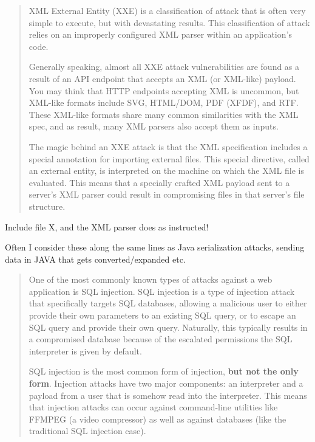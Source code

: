 \documentclass[Screen16to9,17pt]{foils}
\begin{document}
\begin{quote}
XML External Entity (XXE) is a classification of attack that is often very simple to execute, but with devastating results. This classification of attack relies on an improperly configured XML parser within an application’s code.

Generally speaking, almost all XXE attack vulnerabilities are found as a result of an API endpoint that accepts an XML (or XML-like) payload. You may think that HTTP endpoints accepting XML is uncommon, but XML-like formats include SVG, HTML/DOM, PDF (XFDF), and RTF. These XML-like formats share many common similarities with the XML spec, and as result, many XML parsers also accept them as inputs.

The magic behind an XXE attack is that the XML specification includes a special annotation for importing external files. This special directive, called an external entity, is interpreted on the machine on which the XML file is evaluated. This means that a specially crafted XML payload sent to a server’s XML parser could result in compromising files in that server’s file structure.
\end{quote}

\begin{list2}
\item Include file X, and the XML parser does as instructed!
  \item Often I consider these along the same lines as Java serialization attacks, sending data in JAVA that gets converted/expanded etc.
\end{list2}


\begin{quote}
One of the most commonly known types of attacks against a web application is SQL injection. SQL injection is a type of injection attack that specifically targets SQL databases, allowing a malicious user to either provide their own parameters to an existing SQL query, or to escape an SQL query and provide their own query. Naturally, this typically results in a compromised database because of the escalated permissions the SQL interpreter is given by default.

SQL injection is the most common form of injection, {\bf but not the only form}. Injection attacks have two major components: an interpreter and a payload from a user that is somehow read into the interpreter. This means that injection attacks can occur against command-line utilities like FFMPEG (a video compressor) as well as against databases (like the traditional SQL injection case).
\end{quote}
\end{document}
